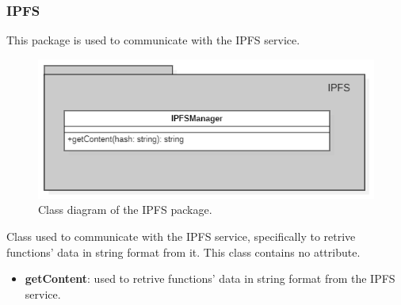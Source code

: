 	\subsubsection{IPFS}
	This package is used to communicate with the IPFS service.
	\begin{figure} [h!]
		\centering
		\includegraphics[width=0.8\linewidth]{diagrammi/etherless-server/IPFS}
		\caption{Class diagram of the IPFS package.}
	\end{figure}
	Class used to communicate with the IPFS service, specifically to retrive functions' data in string format from it.
	This class contains no attribute.
	\begin{itemize}
		\item \textbf{getContent}: used to retrive functions' data in string format from the IPFS service.
	\end{itemize}
